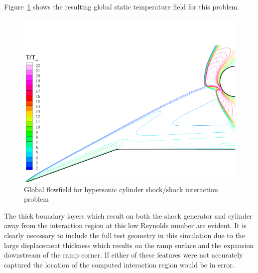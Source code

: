 Figure~\ref{fig:onera_type4_ssi_T_global} shows the resulting global static temperature field for this problem.
\begin{figure}
  \begin{center}
    \includegraphics[width=\textwidth]{figures/onera_type4_ssi/T_global}
    \caption{Global flowfield for hypersonic cylinder shock/shock interaction problem}
    \label{fig:onera_type4_ssi_T_global}    
  \end{center}
\end{figure}
The thick boundary layers which result on both the shock generator and cylinder away from the interaction region at this low Reynolds number are evident.  It is clearly necessary to include the full test geometry in this simulation due to the large displacement thickness which results on the ramp surface and the expansion downstream of the ramp corner.  If either of these features were not accurately captured the location of the computed interaction region would be in error.

